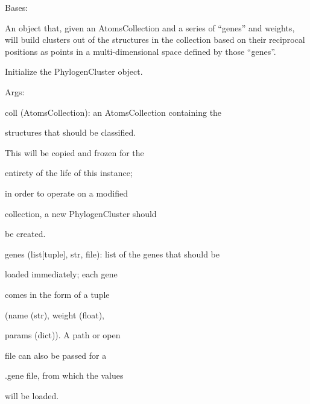 \documentclass[letterpaper,10pt,english]{sphinxmanual}
\begin{document}
\begin{fulllineitems}
\label{doctree/soprano.analyse.phylogen.phylogenclust:soprano.analyse.phylogen.phylogenclust.PhylogenCluster}
Bases: 

An object that, given an AtomsCollection and a series of ``genes'' and
weights, will build clusters out of the structures in the collection based
on their reciprocal positions as points in a multi-dimensional space
defined by those ``genes''.

Initialize the PhylogenCluster object.

\begin{DUlineblock}{0em}
\item[] Args:
\item[]
\begin{DUlineblock}{\DUlineblockindent}
\item[] coll (AtomsCollection): an AtomsCollection containing the
\item[]
\begin{DUlineblock}{\DUlineblockindent}
\item[] structures that should be classified.
\item[] This will be copied and frozen for the
\item[] entirety of the life of this instance;
\item[] in order to operate on a modified
\item[] collection, a new PhylogenCluster should
\item[] be created.
\end{DUlineblock}
\item[] genes (list{[}tuple{]}, str, file): list of the genes that should be
\item[]
\begin{DUlineblock}{\DUlineblockindent}
\item[] loaded immediately; each gene
\item[] comes in the form of a tuple
\item[] (name (str), weight (float),
\item[] params (dict)). A path or open
\item[] file can also be passed for a
\item[] .gene file, from which the values
\item[] will be loaded.

\end{DUlineblock}
\end{DUlineblock}
\end{DUlineblock}
\end{fulllineitems}
\end{document}
